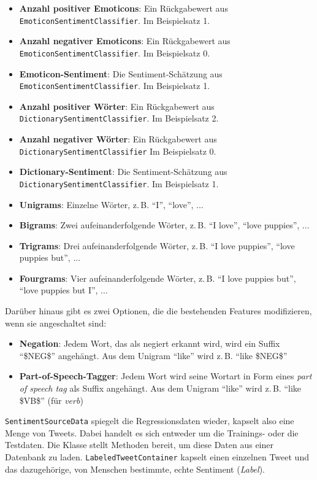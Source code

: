 \begin{itemize}
\itemsep0em
\item \textbf{Anzahl positiver Emoticons}: Ein Rückgabewert aus \texttt{Emoticon\-Sentiment\-Classi\-fier}. Im Beispielsatz 1.
\item \textbf{Anzahl negativer Emoticons}: Ein Rückgabewert aus \texttt{Emoticon\-Sentiment\-Classi\-fier}. Im Beispielsatz 0.
\item \textbf{Emoticon-Sentiment}: Die Sentiment-Schätzung aus \texttt{Emoticon\-Sentiment\-Classi\-fier}. Im Beispielsatz 1.
\item \textbf{Anzahl positiver Wörter}: Ein Rückgabewert aus \texttt{Dictionary\-Sentiment\-Classi\-fier}. Im Beispielsatz 2.
\item \textbf{Anzahl negativer Wörter}: Ein Rückgabewert aus \texttt{Dictionary\-Sentiment\-Classi\-fier} Im Beispielsatz 0.
\item \textbf{Dictionary-Sentiment}: Die Sentiment-Schätzung aus \texttt{Dictionary\-Sentiment\-Clas\-si\-fier}. Im Beispielsatz 1.
\item \textbf{Unigrams}: Einzelne Wörter, z.\,B. "`I"', "`love"', ...
\item \textbf{Bigrams}: Zwei aufeinanderfolgende Wörter, z.\,B. "`I love"', "`love puppies"', ...
\item \textbf{Trigrams}: Drei aufeinanderfolgende Wörter, z.\,B. "`I love puppies"', "`love puppies but"', ...
\item \textbf{Fourgrams}: Vier aufeinanderfolgende Wörter, z.\,B. "`I love puppies but"', "`love puppies but I"', ...
\end{itemize}

Darüber hinaus gibt es zwei Optionen, die die bestehenden Features modifizieren, wenn sie angeschaltet sind:

\begin{itemize}
\itemsep0em
\item \textbf{Negation}: Jedem Wort, das als negiert erkannt wird, wird ein Suffix "`\$NEG\$"' angehängt. Aus dem Unigram "`like"' wird z.\,B. "`like \$NEG\$"'
\item \textbf{Part-of-Speech-Tagger}: Jedem Wort wird seine Wortart in Form eines \textit{part of speech tag} als Suffix angehängt. Aus dem Unigram "`like"' wird z.\,B. "`like \$VB\$"' (für \textit{verb})
\end{itemize}

\texttt{Sentiment\-Source\-Data} spiegelt die Regressionsdaten wieder, kapselt also eine Menge von Tweets. Dabei handelt es sich entweder um die Trainings- oder die Testdaten. Die Klasse stellt Methoden bereit, um diese Daten aus einer Datenbank zu laden. \texttt{Labeled\-Tweet\-Container} kapselt einen einzelnen Tweet und das dazugehörige, von Menschen bestimmte, echte Sentiment (\textit{Label}).

